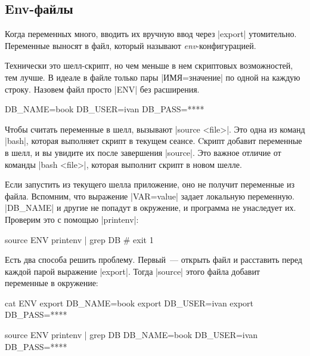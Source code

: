 \subsection{Env-файлы}

Когда переменных много, вводить их вручную ввод через \spverb|export|
утомительно. Переменные выносят в файл, который называют
\emph{env}-конфигурацией.

Технически это шелл-скрипт, но чем меньше в нем скриптовых возможностей, тем
лучше. В идеале в файле только пары \spverb|ИМЯ=значение| по одной на каждую
строку. Назовем файл просто \spverb|ENV| без расширения.

\begin{english}
  \begin{bash}
DB_NAME=book
DB_USER=ivan
DB_PASS=****
  \end{bash}
\end{english}

Чтобы считать переменные в шелл, вызывают \spverb|source <file>|. Это одна из
команд \spverb|bash|, которая выполняет скрипт в текущем сеансе. Cкрипт добавит
переменные в шелл, и вы увидите их после завершения \spverb|source|. Это важное
отличие от команды \spverb|bash <file>|, которая выполнит скрипт в новом шелле.

\begin{english}
\end{english}

Если запустить из текущего шелла приложение, оно не получит переменные из
файла. Вспомним, что выражение \spverb|VAR=value| задает локальную
переменную. \spverb|DB_NAME| и другие не попадут в окружение, и программа не
унаследует их. Проверим это с помощью \spverb|printenv|:

\begin{english}
  \begin{bash}
source ENV
printenv | grep DB
# exit 1
  \end{bash}
\end{english}

Есть два способа решить проблему. Первый~--- открыть файл и расставить перед
каждой парой выражение \spverb|export|. Тогда \spverb|source| этого файла
добавит переменные в окружение:

\begin{english}
  \begin{bash}
cat ENV
export DB_NAME=book
export DB_USER=ivan
export DB_PASS=****

source ENV
printenv | grep DB
DB_NAME=book
DB_USER=ivan
DB_PASS=****
  \end{bash}
\end{english}

